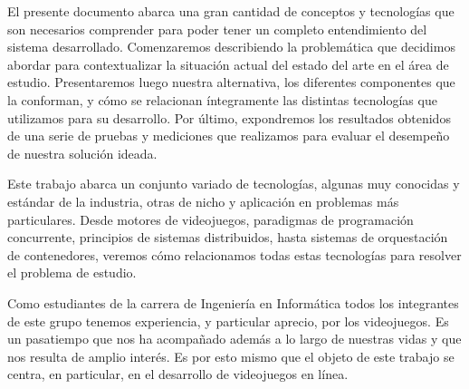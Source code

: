\noindent El presente documento abarca una gran cantidad de conceptos y tecnologías que son necesarios comprender
para poder tener un completo entendimiento del sistema desarrollado. Comenzaremos describiendo la problemática que decidimos
abordar para contextualizar la situación actual del estado del arte en el área de estudio. Presentaremos luego nuestra alternativa,
los diferentes componentes que la conforman, y cómo se relacionan íntegramente las distintas tecnologías que utilizamos para su desarrollo.
Por último, expondremos los resultados obtenidos de una serie de pruebas y mediciones que realizamos para evaluar el desempeño de nuestra solución ideada.

Este trabajo abarca un conjunto variado de tecnologías, algunas muy conocidas y estándar de la industria, otras de nicho y aplicación en problemas más particulares.
Desde motores de videojuegos, paradigmas de programación concurrente, principios de sistemas distribuidos, hasta sistemas de orquestación de contenedores, veremos cómo
relacionamos todas estas tecnologías para resolver el problema de estudio.

Como estudiantes de la carrera de Ingeniería en Informática todos los integrantes de este grupo tenemos experiencia, y particular aprecio, por los videojuegos.
Es un pasatiempo que nos ha acompañado además a lo largo de nuestras vidas y que nos resulta de amplio interés. Es por esto mismo que el objeto de este trabajo
se centra, en particular, en el desarrollo de videojuegos en línea. 
